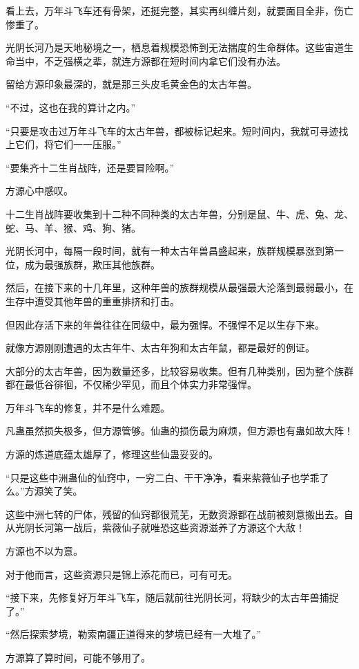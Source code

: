 \begin{this_body}
看上去，万年斗飞车还有骨架，还挺完整，其实再纠缠片刻，就要面目全非，伤亡惨重了。

光阴长河乃是天地秘境之一，栖息着规模恐怖到无法揣度的生命群体。这些宙道生命当中，不乏强横之辈，就连方源都在短时间内拿它们没有办法。

留给方源印象最深的，就是那三头皮毛黄金色的太古年兽。

“不过，这也在我的算计之内。”

“只要是攻击过万年斗飞车的太古年兽，都被标记起来。短时间内，我就可寻迹找上它们，将它们一一压服。”

“要集齐十二生肖战阵，还是要冒险啊。”

方源心中感叹。

十二生肖战阵要收集到十二种不同种类的太古年兽，分别是鼠、牛、虎、兔、龙、蛇、马、羊、猴、鸡、狗、猪。

光阴长河中，每隔一段时间，就有一种太古年兽昌盛起来，族群规模暴涨到第一位，成为最强族群，欺压其他族群。

然后，在接下来的十几年里，这种年兽的族群规模从最强最大沦落到最弱最小，在生存中遭受其他年兽的重重排挤和打击。

但因此存活下来的年兽往往在同级中，最为强悍。不强悍不足以生存下来。

就像方源刚刚遭遇的太古年牛、太古年狗和太古年鼠，都是最好的例证。

大部分的太古年兽，因为数量还多，比较容易收集。但有几种类别，因为整个族群都在最低谷徘徊，不仅稀少罕见，而且个体实力非常强悍。

万年斗飞车的修复，并不是什么难题。

凡蛊虽然损失极多，但方源管够。仙蛊的损伤最为麻烦，但方源也有蛊如故大阵！

方源的炼道底蕴太雄厚了，修理这些仙蛊妥妥的。

“只是这些中洲蛊仙的仙窍中，一穷二白、干干净净，看来紫薇仙子也学乖了么。”方源笑了笑。

这些中洲七转的尸体，残留的仙窍都很荒芜，无数资源都在战前被刻意搬出去。自从光阴长河第一战后，紫薇仙子就唯恐这些资源滋养了方源这个大敌！

方源也不以为意。

对于他而言，这些资源只是锦上添花而已，可有可无。

“接下来，先修复好万年斗飞车，随后就前往光阴长河，将缺少的太古年兽捕捉了。”

“然后探索梦境，勒索南疆正道得来的梦境已经有一大堆了。”

方源算了算时间，可能不够用了。


\end{this_body}
